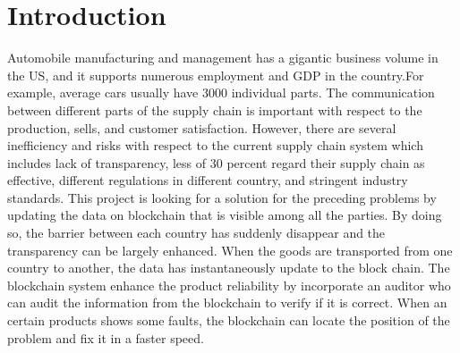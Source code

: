 \documentclass[12pt]{article}
\begin{document}
\section{Introduction}
Automobile manufacturing and management has a gigantic business volume in the US, and it supports numerous employment and GDP in the country.\newline For example, average cars usually have 3000 individual parts. The communication between different parts of the supply chain is important with respect to the production, sells, and customer satisfaction. However, there are several inefficiency and risks with respect to the current supply chain system which includes lack of transparency\cite{choudhurry_2020}, less of 30 percent regard their supply chain as effective, different regulations in different country, and stringent industry standards. This project is looking for a solution for the preceding problems by updating the data on blockchain that is visible among all the parties. By doing so, the barrier between each country has suddenly disappear and the transparency can be largely enhanced. When the goods are transported from one country to another, the data has instantaneously update to the block chain. The blockchain system enhance the product reliability by incorporate an auditor who can audit the information from the blockchain to verify if it is correct. When an certain products shows some faults, the blockchain can locate the position of the problem and fix it in a faster speed.
 
%
\end{document}
